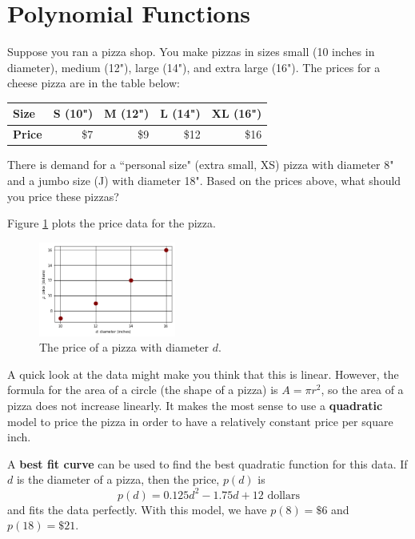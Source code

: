 \section{Polynomial Functions}
\label{sec:polynomial}

\begin{example} 
Suppose you ran a pizza shop. You make pizzas in sizes small (10 inches in diameter), medium (12"), large (14"), and extra large (16"). The prices for a cheese pizza are in the table below:

\begin{table}[!ht]
	\centering
  \begin{tabular}{lrrrr}
    \toprule
    {\bf Size}     & S (10") & M (12") & L (14") & XL (16")\\
    \midrule
    {\bf Price}    & \$7     & \$9    & \$12    & \$16    \\
    \bottomrule
\end{tabular}
\end{table}
There is demand for a ``personal size" (extra small, XS) pizza with diameter 8" and a jumbo size (J) with diameter 18". Based on the prices above, what should you price these pizzas?
\begin{solution}
Figure \ref{fig:1-5-pizza} plots the price data for the pizza.
\begin{figure}[!ht]
	\centering
	\includegraphics[width=0.4\textwidth]{img/chap1/sec1-5/1-5-pizza.png}
	\caption{The price of a pizza with diameter $d$.}
    \label{fig:1-5-pizza}
	\end{figure}
A quick look at the data might make you think that this is linear. However, the formula for the area of a circle (the shape of a pizza) is $A = \pi r^2$, so the area of a pizza does not increase linearly. It makes the most sense to use a {\bf quadratic} model to price the pizza in order to have a relatively constant price per square inch.

A {\bf best fit curve} can be used to find the best quadratic function for this data. If $d$ is the diameter of a pizza, then the price, $p(d)$ is 
$$p(d) = 0.125 d^2 -1.75 d + 12 \text{ dollars}$$
and fits the data perfectly. With this model, we have $p(8) = \$6$ and $p(18) = \$21$.
\end{solution}
\end{example}

